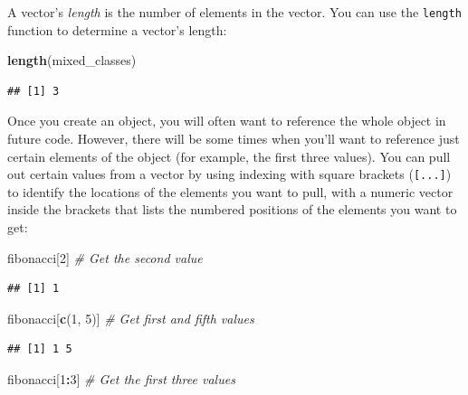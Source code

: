 \documentclass[]{book}
\makeatletter
\newenvironment{Shaded}{\begin{snugshade}}{\end{snugshade}}
\newcommand{\KeywordTok}[1]{\textcolor[rgb]{0.13,0.29,0.53}{\textbf{#1}}}
\newcommand{\DecValTok}[1]{\textcolor[rgb]{0.00,0.00,0.81}{#1}}
\newcommand{\CommentTok}[1]{\textcolor[rgb]{0.56,0.35,0.01}{\textit{#1}}}
\newcommand{\OperatorTok}[1]{\textcolor[rgb]{0.81,0.36,0.00}{\textbf{#1}}}
\newcommand{\NormalTok}[1]{#1}
\newenvironment{kframe}{%
\medskip{}
\setlength{\fboxsep}{.8em}
 \def\at@end@of@kframe{}%
 \ifinner\ifhmode%
  \def\at@end@of@kframe{\end{minipage}}%
  \begin{minipage}{\columnwidth}%
 \fi\fi%
 \def\FrameCommand##1{\hskip\@totalleftmargin \hskip-\fboxsep
 \colorbox{shadecolor}{##1}\hskip-\fboxsep
     \hskip-\linewidth \hskip-\@totalleftmargin \hskip\columnwidth}%
 \MakeFramed {\advance\hsize-\width
   \@totalleftmargin\z@ \linewidth\hsize
   \@setminipage}}%
 {\par\unskip\endMakeFramed%
 \at@end@of@kframe}
\renewenvironment{Shaded}{\begin{kframe}}{\end{kframe}}
\theoremstyle{definition}
\theoremstyle{definition}
\theoremstyle{definition}
\theoremstyle{remark}
\makeatother
\begin{document}
A vector's \emph{length} is the number of elements in the vector. You
can use the \texttt{length} function to determine a vector's length:

\begin{Shaded}
\begin{Highlighting}[]
\KeywordTok{length}\NormalTok{(mixed_classes)}
\end{Highlighting}
\end{Shaded}

\begin{verbatim}
## [1] 3
\end{verbatim}

Once you create an object, you will often want to reference the whole
object in future code. However, there will be some times when you'll
want to reference just certain elements of the object (for example, the
first three values). You can pull out certain values from a vector by
using indexing with square brackets (\texttt{{[}...{]}}) to identify the
locations of the elements you want to pull, with a numeric vector inside
the brackets that lists the numbered positions of the elements you want
to get:

\begin{Shaded}
\begin{Highlighting}[]
\NormalTok{fibonacci[}\DecValTok{2}\NormalTok{] }\CommentTok{# Get the second value}
\end{Highlighting}
\end{Shaded}

\begin{verbatim}
## [1] 1
\end{verbatim}

\begin{Shaded}
\begin{Highlighting}[]
\NormalTok{fibonacci[}\KeywordTok{c}\NormalTok{(}\DecValTok{1}\NormalTok{, }\DecValTok{5}\NormalTok{)] }\CommentTok{# Get first and fifth values}
\end{Highlighting}
\end{Shaded}

\begin{verbatim}
## [1] 1 5
\end{verbatim}

\begin{Shaded}
\begin{Highlighting}[]
\NormalTok{fibonacci[}\DecValTok{1}\OperatorTok{:}\DecValTok{3}\NormalTok{] }\CommentTok{# Get the first three values}
\end{Highlighting}
\end{Shaded}
\end{document}
